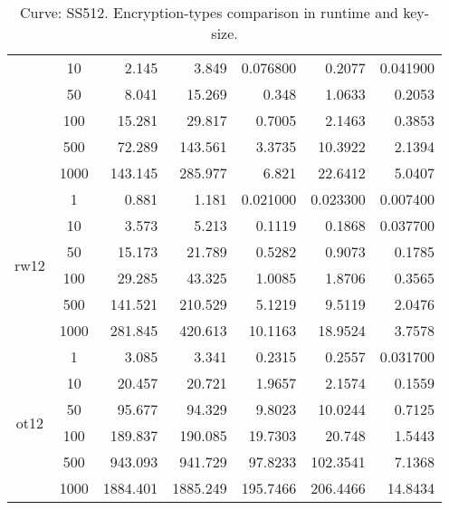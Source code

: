 \documentclass[twoside,11pt,titlepage,a4paper,english,bibliography=totocnumbered,listof=numbered]{scrbook}
\begin{document}
\begin{table}[ht]
{\begin{tabular}{|c|c|r|r|r|r|r|}
&10&    2.145    &    3.849    &    0.076800 &    0.2077   &    0.041900  \\
&50&    8.041    &   15.269    &    0.348    &    1.0633   &    0.2053    \\
&100&   15.281    &   29.817    &    0.7005   &    2.1463   &    0.3853    \\
&500&   72.289    &  143.561    &    3.3735   &   10.3922   &    2.1394    \\
&1000&  143.145    &  285.977    &    6.821    &   22.6412   &    5.0407    \\
\hline
\multirow{6}{*}{rw12} &1&    0.881    &    1.181    &    0.021000 &    0.023300 &    0.007400  \\
&10&    3.573    &    5.213    &    0.1119   &    0.1868   &    0.037700  \\
&50&   15.173    &   21.789    &    0.5282   &    0.9073   &    0.1785    \\
&100&   29.285    &   43.325    &    1.0085   &    1.8706   &    0.3565    \\
&500&  141.521    &  210.529    &    5.1219   &    9.5119   &    2.0476    \\
&1000&  281.845    &  420.613    &   10.1163   &   18.9524   &    3.7578    \\
\hline
\multirow{6}{*}{ot12} &1&    3.085    &    3.341    &    0.2315   &    0.2557   &    0.031700  \\
&10&   20.457    &   20.721    &    1.9657   &    2.1574   &    0.1559    \\
&50&   95.677    &   94.329    &    9.8023   &   10.0244   &    0.7125    \\
&100&  189.837    &  190.085    &   19.7303   &   20.748    &    1.5443    \\
&500&  943.093    &  941.729    &   97.8233   &  102.3541   &    7.1368    \\
&1000& 1884.401    & 1885.249    &  195.7466   &  206.4466   &   14.8434    \\
\hline
\end{tabular}}\caption{Curve: SS512. Encryption-types comparison in runtime and key-size.}\label{table:abe_run_SS512} \end{table} 
\end{document}
